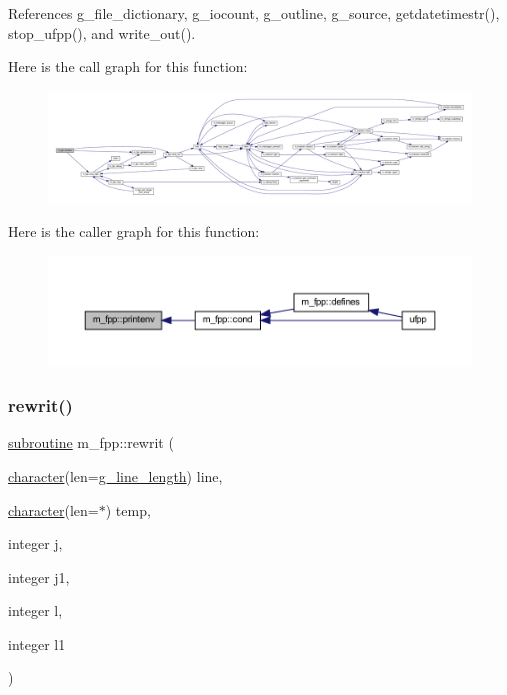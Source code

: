 References g\+\_\+file\+\_\+dictionary, g\+\_\+iocount, g\+\_\+outline, g\+\_\+source, getdatetimestr(), stop\+\_\+ufpp(), and write\+\_\+out().

Here is the call graph for this function\+:
\nopagebreak
\begin{figure}[H]
\begin{center}
\leavevmode
\includegraphics[width=350pt]{namespacem__fpp_a8034546d38694c17677cf638e2760d43_cgraph}
\end{center}
\end{figure}
Here is the caller graph for this function\+:
\nopagebreak
\begin{figure}[H]
\begin{center}
\leavevmode
\includegraphics[width=350pt]{namespacem__fpp_a8034546d38694c17677cf638e2760d43_icgraph}
\end{center}
\end{figure}
\mbox{\label{namespacem__fpp_aae0bad1c7d831068e28f5658d3e1827c}} 
\subsubsection{\texorpdfstring{rewrit()}{rewrit()}}
{\footnotesize\ttfamily \hyperlink{M__stopwatch_83_8txt_acfbcff50169d691ff02d4a123ed70482}{subroutine} m\+\_\+fpp\+::rewrit (\begin{DoxyParamCaption}\item[{\hyperlink{option__stopwatch_83_8txt_abd4b21fbbd175834027b5224bfe97e66}{character}(len=\hyperlink{namespacem__fpp_ab93f8756cf248cf8db932573009d4664}{g\+\_\+line\+\_\+length})}]{line,  }\item[{\hyperlink{option__stopwatch_83_8txt_abd4b21fbbd175834027b5224bfe97e66}{character}(len=$\ast$)}]{temp,  }\item[{integer}]{j,  }\item[{integer}]{j1,  }\item[{integer}]{l,  }\item[{integer}]{l1 }\end{DoxyParamCaption})}

